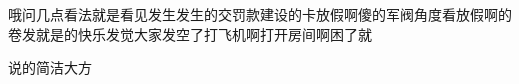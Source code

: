 \clearpage
{}
\begin{Conclusion}	
	
	哦问几点看法就是看见发生发生的交罚款建设的卡放假啊傻的军阀角度看放假啊的卷发就是的快乐发觉大家发空了打飞机啊打开房间啊困了就
	
	说的简洁大方
\end{Conclusion}

